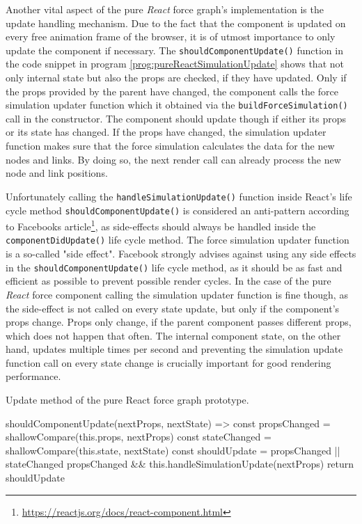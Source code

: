 Another vital aspect of the pure \emph{React} force graph's implementation is the update handling mechanism. Due to the fact that the component is updated on every free animation frame of the browser, it is of utmost importance to only update the component if necessary. The \texttt{shouldComponentUpdate()} function in the code snippet in program \ref{prog:pureReactSimulationUpdate} shows that not only internal state but also the props are checked, if they have updated. Only if the props provided by the parent have changed, the component calls the force simulation updater function which it obtained via the \texttt{buildForceSimulation()} call in the constructor. The component should update though if either its props or its state has changed. If the props have changed, the simulation updater function makes sure that the force simulation calculates the data for the new nodes and links. By doing so, the next render call can already process the new node and link positions.

Unfortunately calling the \texttt{handleSimulationUpdate()} function inside React's life cycle method \texttt{should\linebreak[0]{}Component\linebreak[0]{}Update()} is considered an anti-pattern according to Facebooks article\footnote{\url{https://reactjs.org/docs/react-component.html}}, as side-effects should always be handled inside the \texttt{component\linebreak[0]{}Did\linebreak[0]{}Update()} life cycle method. The force simulation updater function is a so-called "side effect". Facebook strongly advises against using any side effects in the \texttt{should\linebreak[0]{}Component\linebreak[0]{}Update()} life cycle method, as it should be as fast and efficient as possible to prevent possible render cycles. In the case of the pure \emph{React} force component calling the simulation updater function is fine though, as the side-effect is not called on every state update, but only if the component's props change. Props only change, if the parent component passes different props, which does not happen that often. The internal component state, on the other hand, updates multiple times per second and preventing the simulation update function call on every state change is crucially important for good rendering performance.

\begin{program}
\caption{Update method of the pure React force graph prototype.}
\label{prog:pureReactSimulationUpdate}
\begin{JsCode}
shouldComponentUpdate(nextProps, nextState) => {
  const propsChanged = shallowCompare(this.props, nextProps)
  const stateChanged = shallowCompare(this.state, nextState)
  const shouldUpdate = propsChanged || stateChanged
  propsChanged && this.handleSimulationUpdate(nextProps)
  return shouldUpdate
}
\end{JsCode}
\end{program}

